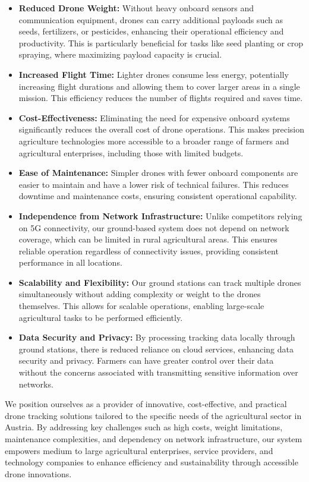 \begin{itemize} \item \textbf{Reduced Drone Weight:} Without heavy onboard sensors and communication equipment, drones can carry additional payloads such as seeds, fertilizers, or pesticides, enhancing their operational efficiency and productivity. This is particularly beneficial for tasks like seed planting or crop spraying, where maximizing payload capacity is crucial. \item \textbf{Increased Flight Time:} Lighter drones consume less energy, potentially increasing flight durations and allowing them to cover larger areas in a single mission. This efficiency reduces the number of flights required and saves time. \item \textbf{Cost-Effectiveness:} Eliminating the need for expensive onboard systems significantly reduces the overall cost of drone operations. This makes precision agriculture technologies more accessible to a broader range of farmers and agricultural enterprises, including those with limited budgets. \item \textbf{Ease of Maintenance:} Simpler drones with fewer onboard components are easier to maintain and have a lower risk of technical failures. This reduces downtime and maintenance costs, ensuring consistent operational capability. \item \textbf{Independence from Network Infrastructure:} Unlike competitors relying on 5G connectivity, our ground-based system does not depend on network coverage, which can be limited in rural agricultural areas. This ensures reliable operation regardless of connectivity issues, providing consistent performance in all locations. \item \textbf{Scalability and Flexibility:} Our ground stations can track multiple drones simultaneously without adding complexity or weight to the drones themselves. This allows for scalable operations, enabling large-scale agricultural tasks to be performed efficiently. \item \textbf{Data Security and Privacy:} By processing tracking data locally through ground stations, there is reduced reliance on cloud services, enhancing data security and privacy. Farmers can have greater control over their data without the concerns associated with transmitting sensitive information over networks. \end{itemize}

We position ourselves as a provider of innovative, cost-effective, and practical drone tracking solutions tailored to the specific needs of the agricultural sector in Austria. By addressing key challenges such as high costs, weight limitations, maintenance complexities, and dependency on network infrastructure, our system empowers medium to large agricultural enterprises, service providers, and technology companies to enhance efficiency and sustainability through accessible drone innovations.

